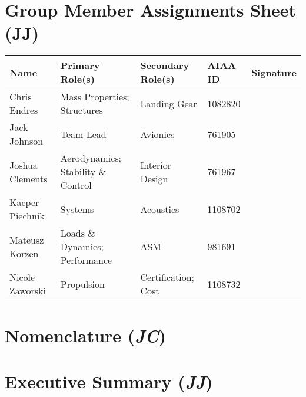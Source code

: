 \documentclass[conf]{new-aiaa}
\begin{document}
\section*{Group Member Assignments Sheet (JJ)}
\begin{center}
    \begin{tabular}{ |p{3cm}||p{3cm}|p{3cm}|p{1.5cm}|p{3cm}| }\toprule
         \textbf{Name} & \textbf{Primary Role(s)} & \textbf{Secondary Role(s)} & \textbf{AIAA ID} & \textbf{Signature} \\\hline
         Chris Endres & Mass Properties; \newline Structures & Landing Gear & 1082820 & \\
         Jack Johnson & Team Lead & Avionics & 761905 & \\ 
         Joshua Clements & Aerodynamics; \newline Stability \& Control & Interior Design & 761967 & \\ 
         Kacper Piechnik & Systems & Acoustics & 1108702 & \\ 
         Mateusz Korzen & Loads \& Dynamics; \newline Performance & ASM & 981691 & \\ 
         Nicole Zaworski & Propulsion & Certification; Cost & 1108732 & \\\bottomrule 
    \end{tabular}
\end{center}

\newpage
\tableofcontents

\newpage

\section*{Nomenclature (\textit{JC})}



\newpage \setcounter{section}{0}
\doublespacing

\section{Executive Summary (\textit{JJ})}

\end{document}
